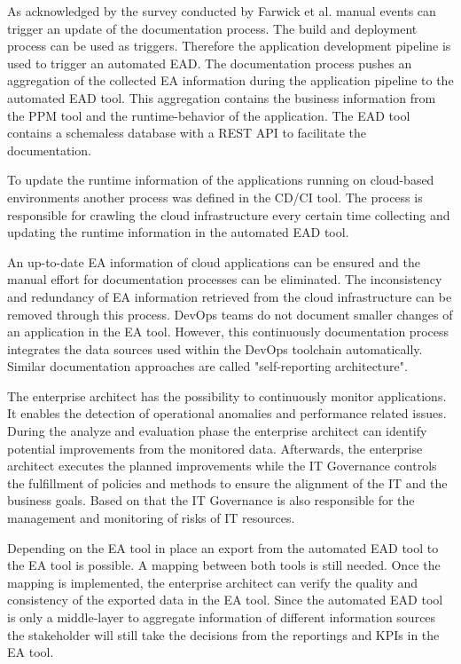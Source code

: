 As acknowledged by the survey conducted by Farwick et al. \cite{Farwick2013} manual events can trigger an update of the documentation process. The build and deployment process can be used as triggers. Therefore the application development pipeline is used to trigger an automated EAD. \cite{Nicolaescu2017} The documentation process pushes an aggregation of the collected EA information during the application pipeline to the automated EAD tool. This aggregation contains the business information from the PPM tool and the runtime-behavior of the application. The EAD tool contains a schemaless database with a REST API to facilitate the documentation. 

To update the runtime information of the applications running on cloud-based environments another process was defined in the CD/CI tool. The process is responsible for crawling the cloud infrastructure every certain time collecting and updating the runtime information in the automated EAD tool.

An up-to-date EA information of cloud applications can be ensured and the manual effort for documentation processes can be eliminated. The inconsistency and redundancy of EA information retrieved from the cloud infrastructure can be removed through this process.
DevOps teams do not document smaller changes of an application in the EA tool. However, this continuously documentation process integrates the data sources used within the DevOps toolchain automatically. Similar documentation approaches are called "self-reporting architecture". \cite{Drews2017}

The enterprise architect has the possibility to continuously monitor applications. It enables the detection of operational anomalies and performance related issues. \cite{Balalaie2016} During the analyze and evaluation phase the enterprise architect can identify potential improvements from the monitored data. Afterwards, the enterprise architect executes the planned improvements while the IT Governance controls the fulfillment of policies and methods to ensure the alignment of the IT and the business goals. Based on that the IT Governance is also responsible for the management and monitoring of risks of IT resources. \cite{Meyer2003} 

Depending on the EA tool in place an export from the automated EAD tool to the EA tool is possible. A mapping between both tools is still needed. Once the mapping is implemented, the enterprise architect can verify the quality and consistency of the exported data in the EA tool. Since the automated EAD tool is only a middle-layer to aggregate information of different information sources the stakeholder will still take the decisions from the reportings and KPIs in the EA tool.

